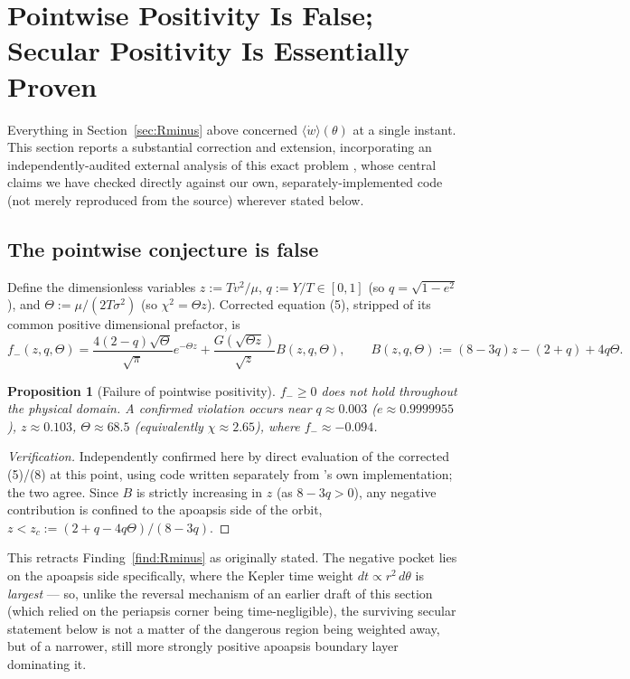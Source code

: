 \documentclass[12pt]{amsart}
\theoremstyle{plain}
\newtheorem{proposition}[theorem]{Proposition}
\theoremstyle{remark}
\begin{document}
\section{Pointwise Positivity Is False; Secular Positivity Is Essentially Proven}\label{sec:secularpositivity}

Everything in Section~\ref{sec:Rminus} above concerned $\langle\dot w\rangle(\theta)$ at a single instant. This section reports a substantial correction and extension, incorporating an independently-audited external analysis of this exact problem \cite{EbertAuditedSecular2026}, whose central claims we have checked directly against our own, separately-implemented code (not merely reproduced from the source) wherever stated below.

\subsection{The pointwise conjecture is false}

Define the dimensionless variables $z:=Tv^2/\mu$, $q:=Y/T\in[0,1]$ (so $q=\sqrt{1-e^2}$), and $\Theta:=\mu/(2T\sigma^2)$ (so $\chi^2=\Theta z$). Corrected equation (5), stripped of its common positive dimensional prefactor, is
\begin{equation}
f_-(z,q,\Theta) = \frac{4(2-q)\sqrt\Theta}{\sqrt\pi}e^{-\Theta z} + \frac{G(\sqrt{\Theta z})}{\sqrt z}B(z,q,\Theta), \qquad B(z,q,\Theta):=(8-3q)z-(2+q)+4q\Theta. \tag{8}
\end{equation}

\begin{proposition}[Failure of pointwise positivity]\label{prop:pointwisefails}
$f_-\geq0$ does not hold throughout the physical domain. A confirmed violation occurs near $q\approx0.003$ ($e\approx0.9999955$), $z\approx0.103$, $\Theta\approx68.5$ (equivalently $\chi\approx2.65$), where $f_-\approx-0.094$.
\end{proposition}

\begin{proof}[Verification]
Independently confirmed here by direct evaluation of the corrected (5)/(8) at this point, using code written separately from \cite{EbertAuditedSecular2026}'s own implementation; the two agree. Since $B$ is strictly increasing in $z$ (as $8-3q>0$), any negative contribution is confined to the apoapsis side of the orbit, $z<z_c:=(2+q-4q\Theta)/(8-3q)$.
\end{proof}

This retracts Finding~\ref{find:Rminus} as originally stated. The negative pocket lies on the apoapsis side specifically, where the Kepler time weight $dt\propto r^2\,d\theta$ is \emph{largest} --- so, unlike the reversal mechanism of an earlier draft of this section (which relied on the periapsis corner being time-negligible), the surviving secular statement below is not a matter of the dangerous region being weighted away, but of a narrower, still more strongly positive apoapsis boundary layer dominating it.
\end{document}
